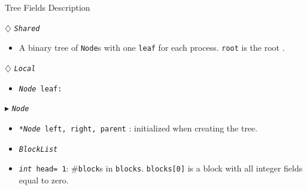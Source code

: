 \documentclass[10pt]{article}
\newcommand{\sub}[1]{\textsubscript{#1}}
\renewcommand{\tt}[1]{\texttt{#1}}
\renewcommand{\sl}[1]{\textsl{#1}}
\renewcommand{\bf}[1]{\textbf{#1}}
\newcommand{\nf}[1]{{\normalfont{\texttt{#1}}}}
\newcommand{\head}{head}
\theoremstyle{definition}
\begin{document}
\begin{algorithm}
\caption{Tree Fields Description}
\begin{algorithmic}[1]
\setcounter{ALG@line}{100}
\begin{multicols}{2}


\Statex $\diamondsuit$ \tt{\sl{Shared}}
\begin{itemize}
\item \textsf{A binary tree of \tt{Node}s with one \tt{leaf} for each process. \tt{root} is the root \nf{node}.}
\end{itemize}

\Statex $\diamondsuit$ \tt{\sl{Local}}
\begin{itemize}
\item \tt{\sl{Node} leaf:} 
\end{itemize}



\Statex $\blacktriangleright$ \tt{\sl{Node}}
\begin{itemize}
\item \tt{\sl{*Node} left, right, parent} \textsf{: initialized  when creating the tree.}
\item \tt{\sl{BlockList}}
\item \tt{\sl{int} \head= 1}\textsf{: \#\tt{block}s in \tt{blocks}. \tt{blocks[0]} is a block with all integer fields equal to zero.}
\end{itemize}

%  
%
%  

    


\end{multicols}
\end{algorithmic}
\end{algorithm}
\end{document}
